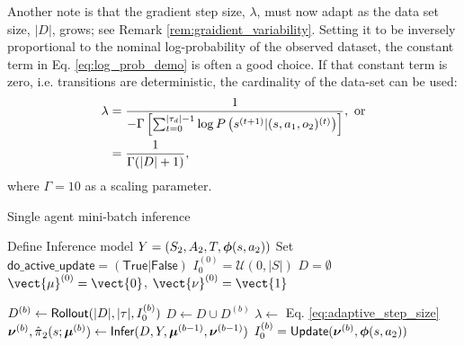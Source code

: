 Another note is that the gradient step size, $\lambda$, must now adapt as the data set size, $|D|$, grows; see Remark
\ref{rem:graidient_variability}. Setting it to be inversely proportional to the nominal log-probability of the observed
dataset, the constant term in Eq. \ref{eq:log_prob_demo} is often a good choice. If that constant term is zero, i.e.
transitions are deterministic, the cardinality of the data-set can be used:
\begin{equation}\label{eq:adaptive_step_size}
    \begin{aligned}
        \lambda & = \frac{1}{-\Gamma \left[ \sum_{t=0}^{\lvert\tau_d\rvert-1}
                                            \log P \left(s^{(t+1)}|(s, a_1, o_2)^{(t)}\right)\right]},\ \text{or}\\
                & = \frac{1}{\Gamma(|D|+1)},
    \end{aligned}
\end{equation}
where $\Gamma=10$ as a scaling parameter.

        \begin{algorithm}
        \caption{Single agent mini-batch inference}
        \label{alg:single_agent_batch}
        \begin{algorithmic}[1]
                \State Define Inference model $Y=(S_2,A_2,T,\boldsymbol{\mathbb{\phi}}(s, a_2))$
                \State Set $\mathsf{do\_active\_update}=(\mathsf{True}|\mathsf{False})$
                \State $I_0^{(0)} = \mathcal{U}(0,|S|)$
                \State $D=\emptyset$ 
                \State $\vect{\mu}^{(0)} = \vect{0}$, $\vect{\nu}^{(0)} = \vect{1}$

                \State $D^{(b)} \leftarrow \mathsf{Rollout}(|D|,|\tau|,I_0^{(b)})$
                \State $D \leftarrow D \cup D^{(b)}$
                \State $\lambda \leftarrow $ Eq. \ref{eq:adaptive_step_size}
                \State
                $\boldsymbol{\mathbb{\nu}}^{(b)} , \hat{\pi_{}}_2(s;\boldsymbol{\mathbb{\mu}}^{(b)})
                \leftarrow \mathsf{Infer}(D,Y,\boldsymbol{\mathbb{\mu}}^{(b-1)}, \boldsymbol{\mathbb{\nu}}^{(b-1)} )$
                \State $I_0^{(b)} = \mathsf{Update}(\boldsymbol{\mathbb{\nu}}^{(b)}, \boldsymbol{\mathbb{\phi}}(s, a_2))$
                \EndIf
                \EndFor
        \end{algorithmic}
\end{algorithm}

